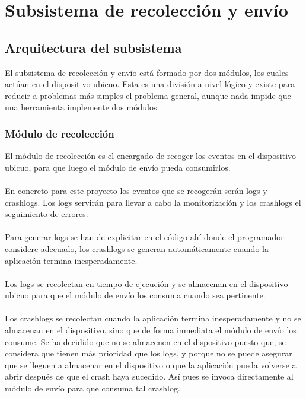 \chapter{Subsistema de recolección y envío}

\section{Arquitectura del subsistema}
El subsistema de recolección y envío está formado por dos módulos, los cuales actúan en el dispositivo ubicuo. Esta es una división a nivel lógico y existe para reducir a problemas más simples el problema general, aunque nada impide que una herramienta implemente dos módulos.


\subsection{Módulo de recolección}
El módulo de recolección es el encargado de recoger los eventos en el dispositivo ubicuo, para que luego el módulo de envío pueda consumirlos. 
\\\\
En concreto para este proyecto los eventos que se recogerán serán logs y crashlogs. Los logs servirán para llevar a cabo la monitorización y los crashlogs el seguimiento de errores.
\\\\
Para generar logs se han de explicitar en el código ahí donde el programador considere adecuado, los crashlogs se generan automáticamente cuando la aplicación termina inesperadamente.
\\\\
Los logs se recolectan en tiempo de ejecución y se almacenan en el dispositivo ubicuo para que el módulo de envío los consuma cuando sea pertinente.
\\\\
Los crashlogs se recolectan cuando la aplicación termina inesperadamente y no se almacenan en el dispositivo, sino que de forma inmediata el módulo de envío los consume. Se ha decidido que no se almacenen en el dispositivo puesto que, se considera que tienen más prioridad que los logs, y porque no se puede asegurar que se lleguen a almacenar en el dispositivo o que la aplicación pueda volverse a abrir después de que el crash haya sucedido. Así pues se invoca directamente al módulo de envío para que consuma tal crashlog.

